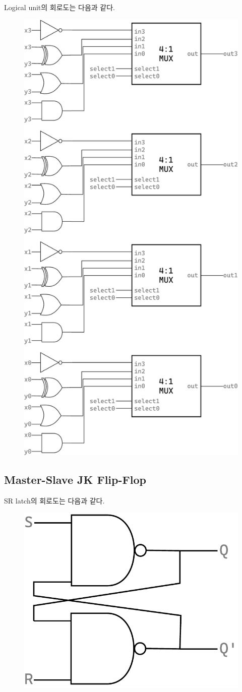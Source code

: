 \documentclass{scrartcl}
\begin{document}
Logical unit의 회로도는 다음과 같다.
\begin{figure}[H]
  \centering
  \includegraphics[width=0.7\linewidth]{logical_unit_schematic.pdf}
\end{figure}

\subsection{Master-Slave JK Flip-Flop}
SR latch의 회로도는 다음과 같다.
\begin{figure}[H]
  \centering
  \includegraphics[width=0.4\linewidth]{sr_schematic.pdf}
\end{figure}
\end{document}
